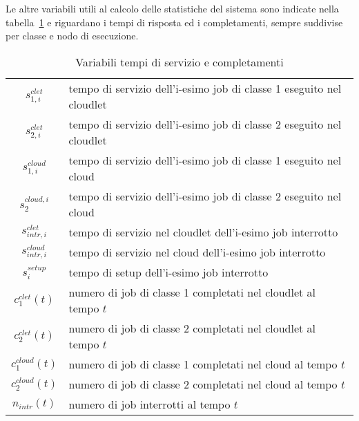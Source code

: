 Le altre variabili utili al calcolo delle statistiche del sistema sono indicate
nella tabella~\ref{vars} e riguardano i tempi di risposta ed i completamenti,
sempre suddivise per classe e nodo di esecuzione.
%
\begin{table}[!h]
\begin{tabular}{c|l}
{$s_{1,i}^{clet}$}     & tempo di servizio dell’i-esimo job di classe 1 eseguito
nel cloudlet \\[2pt]
{$s_{2,i}^{clet}$}     & tempo di servizio dell’i-esimo job di classe 2 eseguito
nel cloudlet \\[2pt]
{$s_{1,i}^{cloud}$}    & tempo di servizio dell’i-esimo job di classe 1 eseguito
nel cloud \\[2pt]
{$s_2^{cloud,i}$}      & tempo di servizio dell’i-esimo job di classe 2 eseguito
nel cloud \\[2pt]
{$s_{intr,i}^{clet}$}  & tempo di servizio nel cloudlet dell’i-esimo job
interrotto \\[2pt]
{$s_{intr,i}^{cloud}$} & tempo di servizio nel cloud dell’i-esimo job interrotto
\\[2pt]
{$s_i^{setup}$}        & tempo di setup dell’i-esimo job interrotto \\[2pt]
{$c_1^{clet}(t)$}      & numero di job di classe 1 completati nel cloudlet al
tempo $t$ \\[2pt]
{$c_2^{clet}(t)$}      & numero di job di classe 2 completati nel cloudlet al
tempo $t$ \\[2pt] 
{$c_1^{cloud}(t)$}     & numero di job di classe 1 completati nel cloud al tempo
$t$ \\[2pt] 
{$c_2^{cloud}(t)$}     & numero di job di classe 2 completati nel cloud al tempo
$t$ \\[2pt]
{$n_{intr}(t)$}        & numero di job interrotti al tempo $t$ \\
\end{tabular}
\centering
\caption{Variabili tempi di servizio e completamenti}
\label{vars}
\end{table}
%
%
